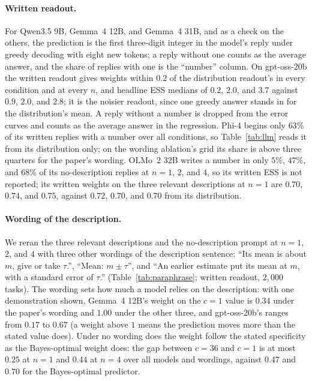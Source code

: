 \documentclass{article}
\begin{document}
\paragraph{Written readout.} For Qwen3.5 9B, Gemma~4 12B, and Gemma~4 31B, and as a check on the others, the prediction is the first three-digit integer in the model's reply under greedy decoding with eight new tokens; a reply without one counts as the average answer, and the share of replies with one is the ``number'' column. On gpt-oss-20b the written readout gives weights within $0.2$ of the distribution readout's in every condition and at every $n$, and headline ESS medians of $0.2$, $2.0$, and $3.7$ against $0.9$, $2.0$, and $2.8$; it is the noisier readout, since one greedy answer stands in for the distribution's mean. A reply without a number is dropped from the error curves and counts as the average answer in the regression. Phi-4 begins only $63\%$ of its written replies with a number over all conditions, so Table~\ref{tab:llm} reads it from its distribution only; on the wording ablation's grid its share is above three quarters for the paper's wording. OLMo~2 32B writes a number in only $5\%$, $47\%$, and $68\%$ of its no-description replies at $n = 1$, $2$, and $4$, so its written ESS is not reported; its written weights on the three relevant descriptions at $n = 1$ are $0.70$, $0.74$, and $0.75$, against $0.72$, $0.70$, and $0.70$ from its distribution.

\paragraph{Wording of the description.} We reran the three relevant descriptions and the no-description prompt at $n = 1$, $2$, and $4$ with three other wordings of the description sentence: ``Its mean is about $m$, give or take $\tau$.'', ``Mean: $m \pm \tau$'', and ``An earlier estimate put its mean at $m$, with a standard error of $\tau$.'' (Table~\ref{tab:paraphrase}; written readout, $2{,}000$ tasks). The wording sets how much a model relies on the description: with one demonstration shown, Gemma~4 12B's weight on the $c = 1$ value is $0.34$ under the paper's wording and $1.00$ under the other three, and gpt-oss-20b's ranges from $0.17$ to $0.67$ (a weight above $1$ means the prediction moves more than the stated value does). Under no wording does the weight follow the stated specificity as the Bayes-optimal weight does: the gap between $c = 36$ and $c = 1$ is at most $0.25$ at $n = 1$ and $0.44$ at $n = 4$ over all models and wordings, against $0.47$ and $0.70$ for the Bayes-optimal predictor.
\end{document}

